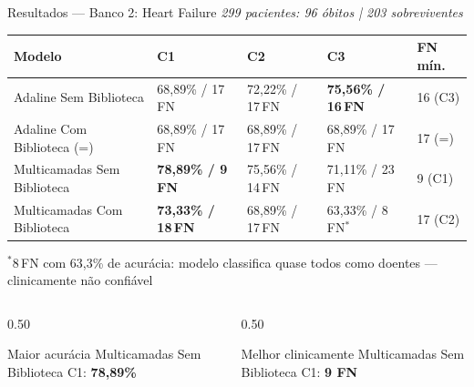 \documentclass[aspectratio=169,11pt,brazil]{beamer}
\begin{document}
\begin{frame}{Resultados — Banco 2: Heart Failure}
  \centering\small
  \textit{299 pacientes: 96 óbitos | 203 sobreviventes}
  \vspace{0.3em}

  \renewcommand{\arraystretch}{1.35}
  \begin{tabular}{lllll}
    \toprule
    \textbf{Modelo} & \textbf{C1} & \textbf{C2} & \textbf{C3} & \textbf{FN mín.} \\
    \midrule
    Adaline Sem Biblioteca & 68,89\% / 17\,FN & 72,22\% / 17\,FN & \textbf{75,56\% / 16\,FN} & 16 (C3) \\
    Adaline Com Biblioteca (=) & 68,89\% / 17\,FN & 68,89\% / 17\,FN & 68,89\% / 17\,FN & 17 (=) \\
    Multicamadas Sem Biblioteca     & \cellcolor{ufvjmbluelight}\textbf{78,89\% / 9\,FN} & 75,56\% / 14\,FN & 71,11\% / 23\,FN & 9 (C1) \\
    Multicamadas Com Biblioteca     & \textbf{73,33\% / 18\,FN} & 68,89\% / 17\,FN & 63,33\% / 8\,FN$^*$ & 17 (C2) \\
    \bottomrule
  \end{tabular}

  {\tiny $^*$8\,FN com 63,3\% de acurácia: modelo classifica quase todos como doentes — clinicamente não confiável}

  \vfill
  \begin{columns}[T]
    \begin{column}{0.50\textwidth}
      \begin{block}{Maior acurácia}
        Multicamadas Sem Biblioteca C1: \textbf{78,89\%}
      \end{block}
    \end{column}
    \begin{column}{0.50\textwidth}
      \begin{alertblock}{Melhor clinicamente}
        Multicamadas Sem Biblioteca C1: \textbf{9 FN}
      \end{alertblock}
    \end{column}
  \end{columns}
  \vspace{0.2em}
\end{frame}
\end{document}
